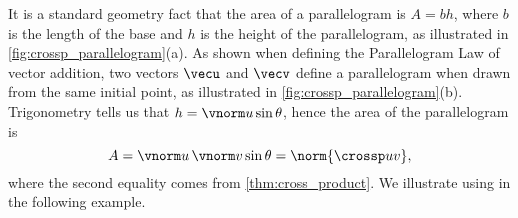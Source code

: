 
It is a standard geometry fact that the area of a parallelogram is $A = bh$, where $b$ is the length of the base and $h$ is the height of the parallelogram, as illustrated in \autoref{fig:crossp_parallelogram}(a). As shown when defining the Parallelogram Law of vector addition, two vectors $\vecu$ and $\vecv$ define a parallelogram when drawn from the same initial point, as illustrated in \autoref{fig:crossp_parallelogram}(b). Trigonometry tells us that $h = \vnorm u \sin \theta$, hence the area of the parallelogram is 
\begin{equation}A = \vnorm u\,\vnorm v\sin\theta = \norm{\crossp uv},\label{eq:crossp1}\end{equation}
where the second equality comes from \autoref{thm:cross_product}.
We illustrate using  in the following example.

